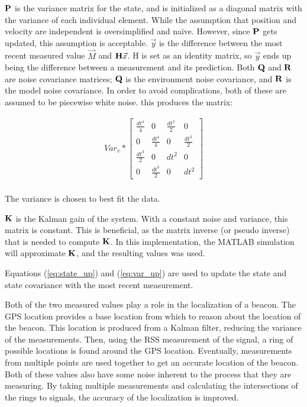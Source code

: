 $\mathbf{P}$ is the variance matrix for the state, and is initialized as a diagonal matrix with the variance of each individual element. While the assumption that position and velocity are independent is oversimplified and na{\"i}ve. However, since $\mathbf{P}$ gets updated, this assumption is acceptable. 
$\vec{y}$ is the difference between the most recent measured value $\vec{M}$ and $\mathbf{H}\vec{x}$. H is set as an identity matrix, so $\vec{y}$ ends up being the difference between a measurement and its prediction. 
Both $\mathbf{Q}$ and $\mathbf{R}$ are noise covariance matrices; $\mathbf{Q}$ is the environment noise covariance, and $\mathbf{R}$ is the model noise covariance. In order to avoid complications, both of these are assumed to be piecewise white noise. this produces the matrix: 

\begin{align}
Var_v * \begin{bmatrix}\frac{dt^4}{4} & 0 & \frac{dt^3}{2} & 0\\0 & \frac{dt^4}{4} & 0 & \frac{dt^3}{2}\\\frac{dt^3}{2} & 0 & dt^2 & 0 \\ 0 & \frac{dt^3}{2} & 0 & dt^2  \end{bmatrix}
\end{align} \\
The variance is chosen to best fit the data. \par
$\mathbf{K}$ is the Kalman gain of the system. With a constant noise and variance, this matrix is constant. This is beneficial, as the matrix inverse (or pseudo inverse) that is needed to compute $\mathbf{K}$. In this implementation, the MATLAB simulation will approximate $\mathbf{K}$, and the resulting values was used. \par
Equations (\ref{eq:state_up}) and (\ref{eq:var_up}) are used to update the state and state covariance with the most recent measurement.\par

Both of the two measured values play a role in the localization of a beacon. The GPS location provides a base location from which to reason about the location of the beacon. This location is produced from a Kalman filter, reducing the variance of the measurements. Then, using the RSS measurement of the signal, a ring of possible locations is found around the GPS location. Eventually, measurements from multiple points are used together to get an accurate location of the beacon. Both of these values also have some noise inherent to the process that they are measuring. By taking multiple measurements and calculating the intersections of the rings to signals, the accuracy of the localization is improved.

